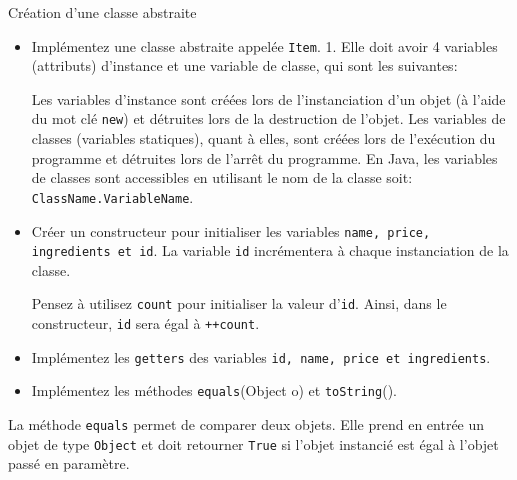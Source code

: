 \begin{Exercice}[10 minutes]{Création d'une classe abstraite}
\begin{itemize}
    \item Implémentez une classe abstraite appelée \lstinline{Item}.
    1. Elle doit avoir 4 variables (attributs) d'instance et une variable de classe, qui sont les suivantes:
     
    \begin{conseil}
        Les variables d'instance sont créées lors de l'instanciation d'un objet (à l'aide du mot clé \lstinline{new}) et détruites lors de la destruction de l'objet. Les variables de classes (variables statiques), quant à elles, sont créées lors de l'exécution du programme et détruites lors de l'arrêt du programme. En Java, les variables de classes sont accessibles en utilisant le nom de la classe soit: \lstinline{ClassName.VariableName}.
    \end{conseil}
    \item Créer un constructeur pour initialiser les variables \lstinline{name, price, ingredients et id}. La variable \lstinline{id} incrémentera à chaque instanciation de la classe.
    \begin{conseil}
        Pensez à utilisez \lstinline{count} pour initialiser la valeur d'\lstinline{id}. Ainsi, dans le constructeur, \lstinline{id} sera égal à \lstinline{++count}.
    \end{conseil}
    \item Implémentez les \lstinline{getters} des variables \lstinline{id, name, price et ingredients}.
    \item Implémentez les méthodes \lstinline{equals}(Object o) et \lstinline{toString}().
\end{itemize}
\begin{conseil}
La méthode \lstinline{equals} permet de comparer deux objets. Elle prend en entrée un objet de type \lstinline{Object} et doit retourner \lstinline{True} si l'objet instancié est égal à l'objet passé en paramètre.
\end{conseil}
    \begin{solution}  
         
    \end{solution}
\end{Exercice}


